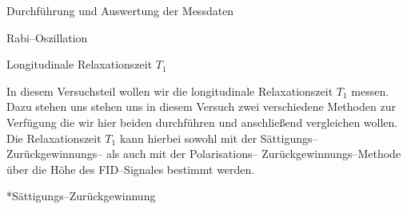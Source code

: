 \documentclass[pdftex, a4paper,11pt, twoside, ngerman]{report}
\begin{document}
\begin{chapter}{Durchführung und Auswertung der Messdaten}
\begin{section}{Rabi--Oszillation}
      
%       
      
      
      
      
    \end{section}
    
    
    
    \begin{section}{
        Longitudinale Relaxationszeit $T_{1}$}
      \label{chpLongRelax}
      
      In diesem Versuchsteil wollen wir die longitudinale Relaxationszeit
      $T_{1}$ messen.
      Dazu stehen uns stehen uns in diesem Versuch zwei verschiedene Methoden
      zur Verfügung die wir hier beiden durchführen und anschließend
      vergleichen wollen.
      Die Relaxationszeit $T_{1}$ kann hierbei sowohl mit der
      Sättigungs--Zurückgewinnungs-- als auch mit der Polarisations--
      Zurückgewinnungs--Methode über die Höhe des FID--Signales bestimmt werden.
      
      
      \begin{subsection}*{Sättigungs--Zurückgewinnung}
        \label{chpLongRelaxSaettigung}
        

\end{subsection}
\end{section}
\end{chapter}
\end{document}
